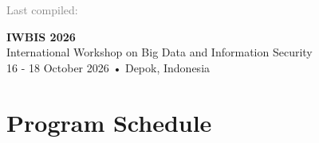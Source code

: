 \documentclass[10pt,a4paper]{article}
\begin{document}
\vspace{0.5em}

\begin{center}
    {\footnotesize\textcolor{gray}{%
        Last compiled: \DTMnow
    }}
\end{center}

\newpage
\begin{center}
{\color{conf}\fontsize{36}{40}\selectfont\bfseries IWBIS 2026}\\[0.2em]
{\Large International Workshop on Big Data and Information Security}\\[0.2em]
{\large 16 - 18 October 2026 \;•\; Depok, Indonesia}
\end{center}

\section{Program Schedule}
\end{document}
